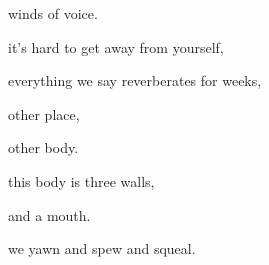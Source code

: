 \documentclass[extrafontsizes, 48pt]{memoir}
\newcommand\blankpage{%
    \null
    \thispagestyle{empty}%
    \addtocounter{page}{-1}%
    \newpage}
\begin{document}
	\begin{minipage}{.6\textwidth}
	winds of voice.
	\afterpage{\blankpage}
	\end{minipage}
	\newpage

	\begin{minipage}{.6\textwidth}
	it's hard to get away from yourself,
	\end{minipage}
	\newpage

	\begin{minipage}{.6\textwidth}
	everything we say reverberates for weeks,
	\end{minipage}
	\newpage

	\begin{minipage}{.6\textwidth}
	other place,
	\end{minipage}
	\newpage

	\begin{minipage}{.6\textwidth}
	other body.
	\afterpage{\blankpage}
	\end{minipage}
	\newpage

	\begin{minipage}{.6\textwidth}
	this body is three walls,
	\end{minipage}
	\newpage

	\begin{minipage}{.6\textwidth}
	and a mouth.
	\end{minipage}
	\newpage

	\begin{minipage}{.6\textwidth}
	we yawn and spew and squeal.
	\end{minipage}
	\newpage
\end{document}
